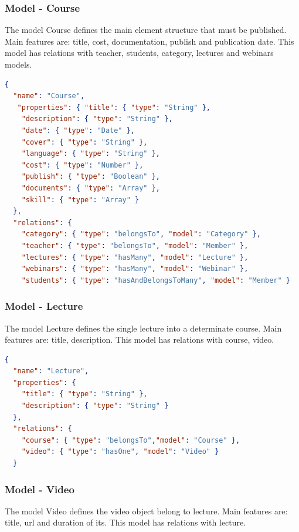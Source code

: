 \subsubsection{ Model - Course}

The model Course defines the main element structure that must be published. Main features are: title, cost, documentation, publish and publication date. This model has relations with teacher, students, category, lectures and webinars models.


\begin{lstlisting}[language=json]
{
  "name": "Course",
   "properties": { "title": { "type": "String" },
    "description": { "type": "String" },
    "date": { "type": "Date" },
    "cover": { "type": "String" },
    "language": { "type": "String" },
    "cost": { "type": "Number" },
    "publish": { "type": "Boolean" },
    "documents": { "type": "Array" },
    "skill": { "type": "Array" }
  },
  "relations": {
    "category": { "type": "belongsTo", "model": "Category" },
    "teacher": { "type": "belongsTo", "model": "Member" },
    "lectures": { "type": "hasMany", "model": "Lecture" },
    "webinars": { "type": "hasMany", "model": "Webinar" },
    "students": { "type": "hasAndBelongsToMany", "model": "Member" }

\end{lstlisting}

\subsubsection{ Model - Lecture}

The model Lecture defines the single lecture into a determinate course. Main features are: title, description. This model has relations with course, video.


\begin{lstlisting}[language=json]
{
  "name": "Lecture",
  "properties": {
    "title": { "type": "String" },
    "description": { "type": "String" }
  },
  "relations": {
    "course": { "type": "belongsTo","model": "Course" },
    "video": { "type": "hasOne", "model": "Video" }
  }

\end{lstlisting}

\subsubsection{ Model - Video}

The model Video defines the video object belong to lecture. Main features are: title, url and duration of its. This model has relations with lecture.


